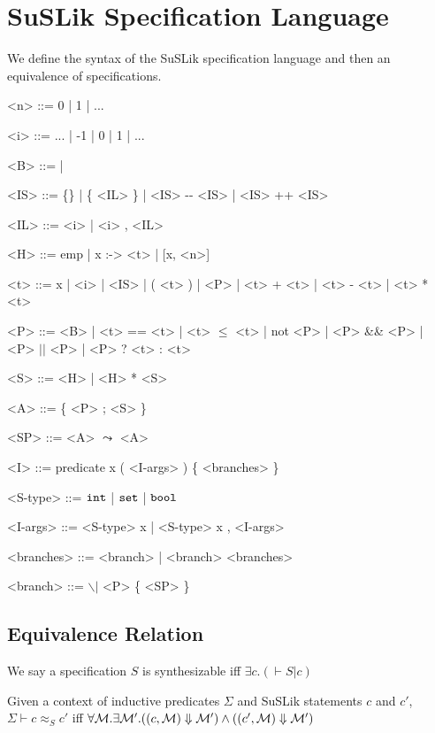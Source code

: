 \documentclass[10pt]{article}
\begin{document}
\section{SuSLik Specification Language}
\label{sec:SuSLikDef}

We define the syntax of the SuSLik specification language and then an equivalence of specifications.

\begin{grammar}
  <n> ::= 0 | 1 | ...

  <i> ::= ... | -1 | 0 | 1 | ...

  <B> ::= \true | \false

  <IS> ::= \{\} | \{ <IL> \} | <IS> -{}- <IS> | <IS> ++ <IS>

  <IL> ::= <i> | <i> , <IL>

  <H> ::= emp | x :-> <t> | [x, <n>]

  <t> ::= x | <i> | <IS> | ( <t> ) | <P> | <t> + <t> | <t> - <t> | <t> * <t>

  <P> ::= <B> | <t> == <t> | <t> $\le$ <t> | not <P> | <P> \&\& <P> | <P> $||$ <P> | <P> ? <t> : <t>

  <S> ::= <H> | <H> * <S>

  <A> ::= \{ <P> ; <S> \}

  <SP> ::= <A> $\leadsto$ <A>

  <I> ::= predicate x ( <I-args> ) \{ <branches> \}

  <S-type> ::= $\texttt{int}$ | $\texttt{set}$ | $\texttt{bool}$

  <I-args> ::= <S-type> x | <S-type> x , <I-args>
  
  <branches> ::= <branch> | <branch> <branches>

  <branch> ::= $\backslash|$ <P> \Ra\; \{ <SP> \}
\end{grammar}

\subsection{Equivalence Relation}
\label{sec:SuSLikEquiv}

\begin{definition}[Synthesizability]
  We say a specification $S$ is \textnormal{synthesizable} iff $\exists c. (\vdash S|c)$
\end{definition}

\begin{definition}
  Given a context of inductive predicates $\Sigma$ and SuSLik statements $c$ and $c'$, $\Sigma \vdash c \approx_S c'$ iff
    $\forall \mathcal{M}. \exists \mathcal{M'}.
      ((c, \mathcal{M}) \Downarrow \mathcal{M'})
      \land
      ((c', \mathcal{M}) \Downarrow \mathcal{M'})$
\end{definition}
\end{document}
